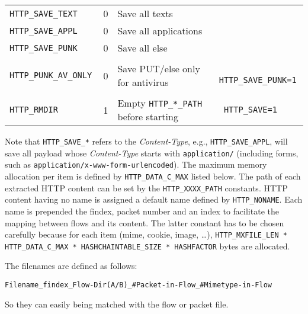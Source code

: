 \documentclass[documentation]{subfiles}
\begin{document}
\begin{longtable}{>{\tt}lcl>{\tt\small}l}
    HTTP\_SAVE\_TEXT     & 0 & Save all texts                                  & \\
    HTTP\_SAVE\_APPL     & 0 & Save all applications                           & \\
    HTTP\_SAVE\_PUNK     & 0 & Save all else                                   & \\
    \\
    HTTP\_PUNK\_AV\_ONLY & 0 & Save PUT/else only for antivirus                & HTTP\_SAVE\_PUNK=1\\
    \\
    HTTP\_RMDIR          & 1 & Empty {\tt\small HTTP\_*\_PATH} before starting & HTTP\_SAVE=1\\
    \bottomrule
\end{longtable}

Note that {\tt HTTP\_SAVE\_*} refers to the {\em Content-Type}, e.g., {\tt HTTP\_SAVE\_APPL}, will save all payload whose {\em Content-Type} starts with {\tt application/} (including forms, such as {\tt application/x-www-form-urlencoded}).
The maximum memory allocation per item is defined by {\tt HTTP\_DATA\_C\_MAX} listed below.
The path of each extracted HTTP content can be set by the {\tt HTTP\_XXXX\_PATH} constants.
HTTP content having no name is assigned a default name defined by {\tt HTTP\_NONAME}. Each name is
prepended the findex, packet number and an index to facilitate the mapping between flows and its content.
The latter constant has to be chosen carefully because for each item (mime, cookie, image, \ldots),
{\tt HTTP\_MXFILE\_LEN * HTTP\_DATA\_C\_MAX * HASHCHAINTABLE\_SIZE * HASHFACTOR} bytes are allocated.

The filenames are defined as follows:
\begin{center}
    {\tt Filename\_findex\_Flow-Dir(A/B)\_\#Packet-in-Flow\_\#Mimetype-in-Flow}
\end{center}
So they can easily being matched with the flow or packet file.
\end{document}
